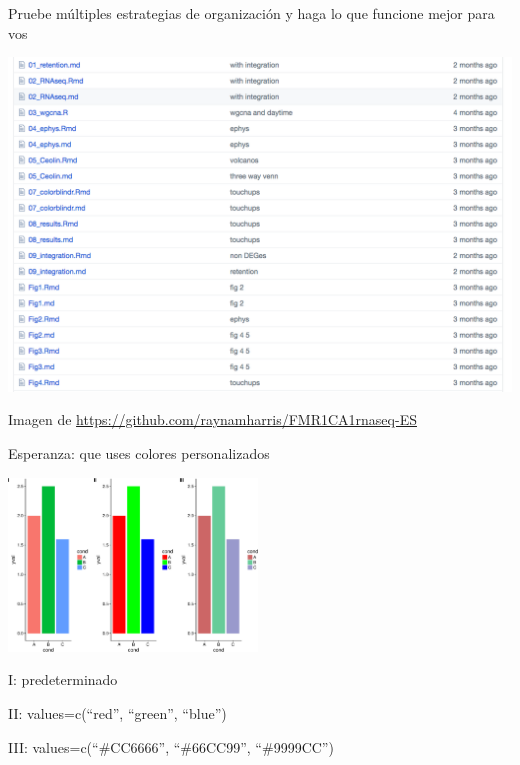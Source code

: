 \begin{frame}{Pruebe múltiples estrategias de organización y haga lo que
funcione mejor para vos}

\includegraphics{../figures/talk/Rworkflow.png}

Imagen de \url{https://github.com/raynamharris/FMR1CA1rnaseq-ES}

\end{frame}

\begin{frame}{Esperanza: que uses colores personalizados}

\includegraphics[width=250px]{../figures/talk/unnamed-chunk-1-1}

I: predeterminado

II: values=c(``red'', ``green'', ``blue'')

III: values=c(``\#CC6666'', ``\#66CC99'', ``\#9999CC'')

\end{frame}

